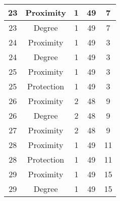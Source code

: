 \documentclass[results.tex]{subfiles}
\begin{document}
\begin{center}
\begin{tabular}{| c || c | c | c | c |}
            \hline
            23                      & Proximity                    & 1                      & 49                      & 7                    \\
            \hline
            23                      & Degree                       & 1                      & 49                      & 7                    \\
            \hline
            24                      & Proximity                    & 1                      & 49                      & 3                    \\
            \hline
            24                      & Degree                       & 1                      & 49                      & 3                    \\
            \hline
            25                      & Proximity                    & 1                      & 49                      & 3                    \\
            \hline
            25                      & Protection                   & 1                      & 49                      & 3                    \\
            \hline
            26                      & Proximity                    & 2                      & 48                      & 9                    \\
            \hline
            26                      & Degree                       & 2                      & 48                      & 9                    \\
            \hline
            27                      & Proximity                    & 2                      & 48                      & 9                    \\
            \hline
            28                      & Proximity                    & 1                      & 49                      & 11                   \\
            \hline
            28                      & Protection                   & 1                      & 49                      & 11                   \\
            \hline
            29                      & Proximity                    & 1                      & 49                      & 15                   \\
            \hline
            29                      & Degree                       & 1                      & 49                      & 15                   \\

\end{tabular}
\end{center}
\end{document}
